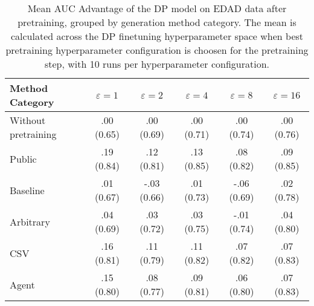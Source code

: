 \begin{table}[h!]
    \centering
    \caption{Mean AUC Advantage of the DP model on EDAD data after pretraining, grouped by generation method category. The mean is calculated across the DP finetuning hyperparameter space when best pretraining hyperparameter configuration is choosen for the pretraining step, with 10 runs per hyperparameter configuration.}
    \label{tab:epsilon_comparison}
    \begin{tabular}{lccccc}
    \toprule
    Method Category & $\varepsilon=1$ & $\varepsilon=2$ & $\varepsilon=4$ & $\varepsilon=8$ & $\varepsilon=16$ \\
    \midrule
    Without pretraining & .00 {\small (0.65)} & .00 {\small (0.69)} & .00 {\small (0.71)} & .00 {\small (0.74)} & .00 {\small (0.76)} \\
    \arrayrulecolor{black!50!}\midrule
    Public & \cellcolor{gold!30}.19 {\small (0.84)} & \cellcolor{gold!30}.12 {\small (0.81)} & \cellcolor{gold!30}.13 {\small (0.85)} & \cellcolor{gold!30}.08 {\small (0.82)} & \cellcolor{gold!30}.09 {\small (0.85)} \\
    \arrayrulecolor{black!50!}\midrule
    Baseline & .01 {\small (0.67)} & -.03 {\small (0.66)} & .01 {\small (0.73)} & -.06 {\small (0.69)} & .02 {\small (0.78)} \\
    \arrayrulecolor{black!50!}\midrule
    Arbitrary & .04 {\small (0.69)} & .03 {\small (0.72)} & .03 {\small (0.75)} & -.01 {\small (0.74)} & .04 {\small (0.80)} \\
    \arrayrulecolor{black!50!}\midrule
    CSV & \cellcolor{silver!30}.16 {\small (0.81)} & \cellcolor{silver!30}.11 {\small (0.79)} & \cellcolor{silver!30}.11 {\small (0.82)} & \cellcolor{silver!30}.07 {\small (0.82)} & \cellcolor{silver!30}.07 {\small (0.83)} \\
    Agent & \cellcolor{bronze!30}.15 {\small (0.80)} & \cellcolor{bronze!30}.08 {\small (0.77)} & \cellcolor{bronze!30}.09 {\small (0.81)} & \cellcolor{bronze!30}.06 {\small (0.80)} & \cellcolor{bronze!30}.07 {\small (0.83)} \\
    \bottomrule
    \end{tabular}
\end{table}